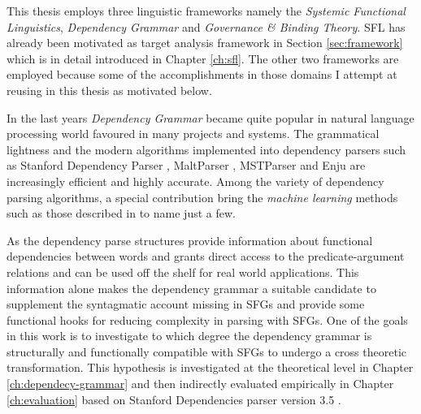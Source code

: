 %
This thesis employs three linguistic frameworks namely the \textit{Systemic Functional Linguistics}, \textit{Dependency Grammar} and \textit{Governance \& Binding Theory}. SFL has already been motivated as target analysis framework in Section \ref{sec:framework} which is in detail introduced in Chapter \ref{ch:sfl}. The other two frameworks are employed because some of the accomplishments in those domains I attempt at reusing in this thesis as motivated below. 


%
In the last years \textit{Dependency Grammar} \citep{Tesniere2015} became quite popular in natural language processing world favoured in many projects and systems. The grammatical lightness and the  modern algorithms implemented into dependency parsers such as Stanford Dependency Parser \citep{Marneffe2006}, MaltParser \citep{Nivre2006}, MSTParser \citep{McDonald2006} and Enju \citep{Miyao2005} are increasingly efficient and highly accurate. Among the variety of dependency parsing algorithms, a special contribution bring the \textit{machine learning} methods such as those described in \citet{mcdonald2005online, mcdonald2006online, carreras2007experiments, zhang2011transition, pei2015effective} to name just a few. 

As the dependency parse structures provide information about functional dependencies between words and grants direct access to the predicate-argument relations and can be used off the shelf for real world applications. 
This information alone makes the dependency grammar a suitable candidate to supplement the syntagmatic account missing in SFGs and provide some functional hooks for reducing complexity in parsing with SFGs. One of the goals in this work is to investigate to which degree the dependency grammar is structurally and functionally compatible with SFGs to undergo a cross theoretic transformation. This hypothesis is investigated at the theoretical level in Chapter \ref{ch:dependecy-grammar} and then indirectly evaluated empirically in Chapter \ref{ch:evaluation} based on Stanford Dependencies parser version 3.5 \citep{Marneffe2008a,Marneffe2008, Marneffe2014}. 

